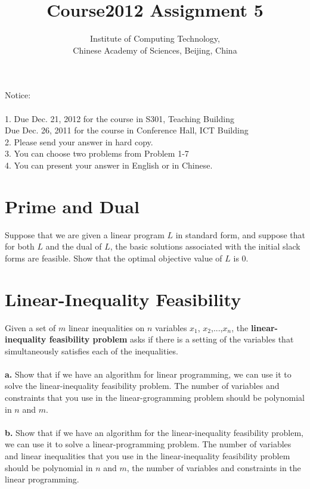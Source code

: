 \documentclass[a4paper,11pt]{article}
\title{Course2012 Assignment 5}
\author{Institute of Computing Technology, \\
                       Chinese Academy of Sciences, Beijing, China }
\begin{document}
\maketitle

Notice:\\\\
1. Due Dec. 21, 2012 for the course in S301, Teaching Building\\
\qquad Due Dec. 26, 2011 for the course in Conference Hall, ICT Building\\
2. Please send your answer in hard copy.\\
3. You can choose two problems from Problem 1-7\\
4. You can present your answer in English or in Chinese.

\section{Prime and Dual}
Suppose that we are given a linear program $L$ in standard form, and suppose that for both $L$ and the dual of $L$, the basic solutions associated with the initial slack forms are feasible. Show that the optimal objective value of $L$ is 0.

\section{Linear-Inequality Feasibility}
Given a set of $m$ linear inequalities on $n$ variables $x_1$, $x_2$,...,$x_n$, the {\bf linear-inequality feasibility problem} asks if there is a setting of the variables that simultaneously satisfies each of the inequalities.\\\\
{\bf a.} Show that if we have an algorithm for linear programming, we can use it to solve the linear-inequality feasibility problem. The number of variables and constraints that you use in the linear-grogramming problem should be polynomial in $n$ and $m$.\\\\
{\bf b.} Show that if we have an algorithm for the linear-inequality feasibility problem, we can use it to solve a linear-programming problem. The number of variables and linear inequalities that you use in the linear-inequality feasibility problem should be polynomial in $n$ and $m$, the number of variables and constraints in the linear programming.
\end{document}
